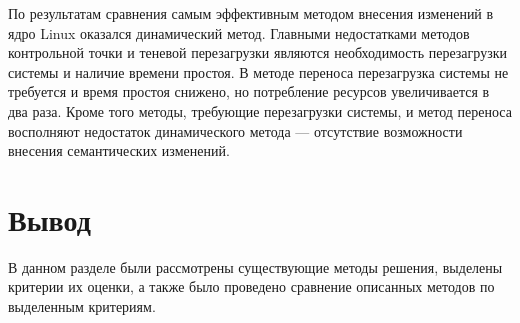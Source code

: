 По результатам сравнения самым эффективным методом внесения изменений в ядро Linux оказался динамический метод. Главными недостатками методов контрольной точки и теневой перезагрузки являются необходимость перезагрузки системы и наличие времени простоя. В методе переноса перезагрузка системы не требуется и время простоя снижено, но потребление ресурсов увеличивается в два раза. Кроме того методы, требующие перезагрузки системы, и метод переноса восполняют недостаток динамического метода --- отсутствие возможности внесения семантических изменений.

\section{Вывод}

В данном разделе были рассмотрены существующие методы решения, выделены критерии их оценки, а также было проведено сравнение описанных методов по выделенным критериям.
